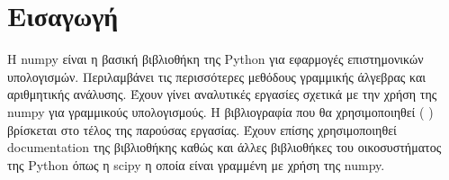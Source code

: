 \chapter{Εισαγωγή}
Η {\en numpy} είναι η βασική βιβλιοθήκη της {\en Python} για εφαρμογές επιστημονικών υπολογισμών. Περιλαμβάνει τις περισσότερες μεθόδους γραμμικής άλγεβρας και αριθμητικής ανάλυσης. Έχουν γίνει αναλυτικές εργασίες σχετικά με την χρήση της {\en numpy} για γραμμικούς υπολογισμούς. Η βιβλιογραφία που θα χρησιμοποιηθεί (\cite{brownlee2018statistical}
\cite{son2020linear}
\cite{deisenroth2020mathematics}
\cite{klein2013coding}) βρίσκεται στο τέλος της παρούσας εργασίας. Έχουν επίσης χρησιμοποιηθεί {\en documentation} της βιβλιοθήκης καθώς και άλλες βιβλιοθήκες του οικοσυστήματος της {\en Python} όπως η {\en scipy} η οποία είναι γραμμένη με χρήση της {\en numpy}.